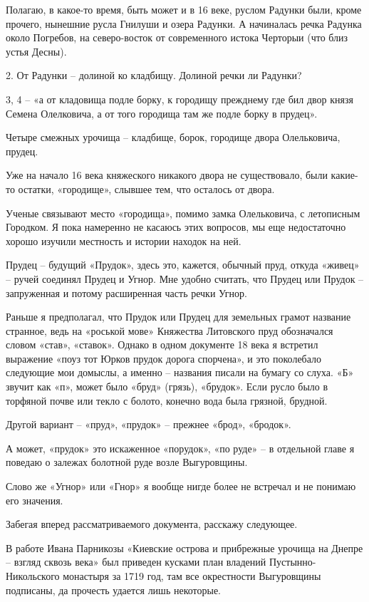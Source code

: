 Полагаю, в какое-то время, быть может и в 16 веке, руслом Радунки были, кроме прочего, нынешние русла Гнилуши и озера Радунки. А начиналась речка Радунка около Погребов, на северо-восток от современного истока Черторыи (что близ устья Десны).

2. От Радунки – долиной ко кладбищу. Долиной речки ли Радунки?

3, 4 – «а от кладовища подле борку, к городищу прежднему где бил двор князя Семена Олелковича, а от того городища там же подле борку в прудец».  

Четыре смежных урочища – кладбище, борок, городище двора Олельковича, прудец. 

Уже на начало 16 века княжеского никакого двора не существовало, были какие-то остатки, «городище», слывшее тем, что осталось от двора. 

Ученые связывают место «городища», помимо замка Олельковича, с летописным Городком. Я пока намеренно не касаюсь этих вопросов, мы еще недостаточно хорошо изучили местность и истории находок на ней.

Прудец – будущий «Прудок», здесь это, кажется, обычный пруд, откуда «живец» – ручей соединял Прудец и Угнор. Мне удобно считать, что Прудец или Прудок – запруженная и потому расширенная часть речки Угнор.

Раньше я предполагал, что Прудок или Прудец для земельных грамот название странное, ведь на «роськой мове» Княжества Литовского пруд обозначался словом «став», «ставок». Однако в одном документе 18 века я встретил выражение «поуз тот Юрков прудок дорога спорчена», и это поколебало следующие мои домыслы, а именно – названия писали на бумагу со слуха. «Б» звучит как «п», может было «бруд» (грязь), «брудок». Если русло было в торфяной почве или текло с болото, конечно вода была грязной, брудной.

Другой вариант – «пруд», «прудок» – прежнее «брод», «бродок». 

А может, «прудок» это искаженное «порудок», «по руде» – в отдельной главе я поведаю о залежах болотной руде возле Выгуровщины.

Слово же «Угнор» или «Гнор» я вообще нигде более не встречал и не понимаю его значения.

Забегая вперед рассматриваемого документа, расскажу следующее.

В работе Ивана Парникозы «Киевские острова и прибрежные урочища на Днепре – взгляд сквозь века» был приведен кусками план владений Пустынно-Никольско\-го монастыря за 1719 год, там все окрестности Выгуровщины подписаны, да прочесть удается лишь некоторые.

